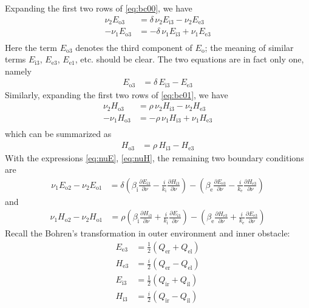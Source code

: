 Expanding the first two rows of \eqref{eq:bc00}, we have
\begin{align*}
  \nu_2 E_{\text{o}3} &= \delta\,\nu_2 E_{\text{i}3} -\nu_2 E_{\text{e}3} \\
  -\nu_1 E_{\text{o}3} &= -\delta\,\nu_1 E_{\text{i}3} + \nu_1 E_{\text{e}3} \\
\end{align*}
Here the term $E_{\text{o}3}$ denotes the third component of $E_{\text{o}}$; the meaning of similar terms $E_{\text{i}3}$, $E_{\text{e}3}$, $E_{\text{e}1}$, etc. should be clear. The two equations are in fact only one, namely
\begin{align}\label{eq:bc2d00}
  E_{\text{o}3} &= \delta\,E_{\text{i}3} - E_{\text{e}3}
\end{align}
Similarly, expanding the first two rows of \eqref{eq:bc01}, we have
\begin{align*}
  \nu_2 H_{\text{o}3} &= \rho\,\nu_2 H_{\text{i}3} -\nu_2 H_{\text{e}3} \\
  -\nu_1 H_{\text{o}3} &= -\rho\,\nu_1 H_{\text{i}3} + \nu_1 H_{\text{e}3} \\
\end{align*}
which can be summarized as 
\begin{align}\label{eq:bc2d01}
  H_{\text{o}3} &= \rho\,H_{\text{i}3} - H_{\text{e}3} 
\end{align}
With the expressions \eqref{eq:nuE}, \eqref{eq:nuH}, the remaining two boundary conditions are
\begin{align}\label{eq:bc2d02}
  \nu_1 E_{\text{o}2} - \nu_2 E_{\text{o}1} &= \delta\left(\beta_\text{i}\frac{\partial E_{\text{i}3}}{\partial\nu} - \frac{i}{k_\text{i}}\frac{\partial H_{\text{i}3}}{\partial\nu}\right) -\left(\beta_\text{e}\frac{\partial E_{\text{e}3}}{\partial\nu} - \frac{i}{k_\text{e}}\frac{\partial H_{\text{e}3}}{\partial\nu}\right)
\end{align}
and 
\begin{align}\label{eq:bc2d03}
  \nu_1 H_{\text{o}2} - \nu_2 H_{\text{o}1} &= \rho\left(\beta_\text{i}\frac{\partial H_{\text{i}3}}{\partial\nu} + \frac{i}{k_\text{i}}\frac{\partial E_{\text{i}3}}{\partial\nu}\right) -\left(\beta_\text{e}\frac{\partial H_{\text{e}3}}{\partial\nu} + \frac{i}{k_\text{e}}\frac{\partial E_{\text{e}3}}{\partial\nu}\right) 
\end{align}
Recall the Bohren's transformation in outer environment and inner obstacle:
\begin{equation}\label{eq:bohrenc}
\begin{split}
  E_{\text{e}3} &= \frac{1}{2}\left(Q_\text{er} + Q_\text{el}\right) \\
  H_{\text{e}3} &= \frac{i}{2}\left(Q_\text{er} - Q_\text{el}\right) \\
  E_{\text{i}3} &= \frac{1}{2}\left(Q_\text{ir} + Q_\text{il}\right) \\
  H_{\text{i}3} &= \frac{i}{2}\left(Q_\text{ir} - Q_\text{il}\right) \\
\end{split}
\end{equation}

